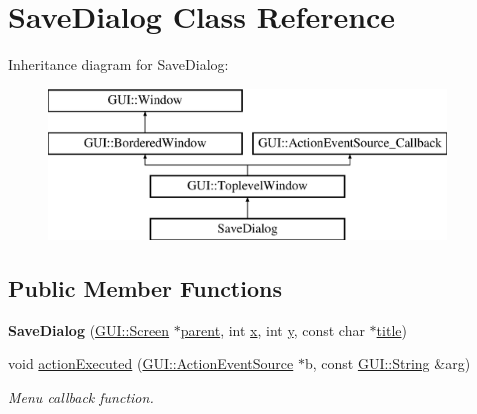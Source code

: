 \hypertarget{classSaveDialog}{\section{Save\-Dialog Class Reference}
\label{classSaveDialog}
}
Inheritance diagram for Save\-Dialog\-:\begin{figure}[H]
\begin{center}
\leavevmode
\includegraphics[height=4.000000cm]{classSaveDialog}
\end{center}
\end{figure}
\subsection*{Public Member Functions}
\begin{DoxyCompactItemize}
\item 
\hypertarget{classSaveDialog_a0b63b5fc1b451512ccf0f208406fca3a}{{\bfseries Save\-Dialog} (\hyperlink{classGUI_1_1Screen}{G\-U\-I\-::\-Screen} $\ast$\hyperlink{classGUI_1_1Window_a2e593ff65e7702178d82fe9010a0b539}{parent}, int \hyperlink{classGUI_1_1Window_a6ca6a80ca00c9e1d8ceea8d3d99a657d}{x}, int \hyperlink{classGUI_1_1Window_a0ee8e923aff2c3661fc2e17656d37adf}{y}, const char $\ast$\hyperlink{classGUI_1_1ToplevelWindow_a04de191f9a57b5b584657866a4ac6843}{title})}\label{classSaveDialog_a0b63b5fc1b451512ccf0f208406fca3a}

\item 
\hypertarget{classSaveDialog_af7dc3bd044aa8a69ae430faf64430058}{void \hyperlink{classSaveDialog_af7dc3bd044aa8a69ae430faf64430058}{action\-Executed} (\hyperlink{classGUI_1_1ActionEventSource}{G\-U\-I\-::\-Action\-Event\-Source} $\ast$b, const \hyperlink{classGUI_1_1String}{G\-U\-I\-::\-String} \&arg)}\label{classSaveDialog_af7dc3bd044aa8a69ae430faf64430058}

\begin{DoxyCompactList}\small\item\em Menu callback function. \end{DoxyCompactList}\end{DoxyCompactItemize}
